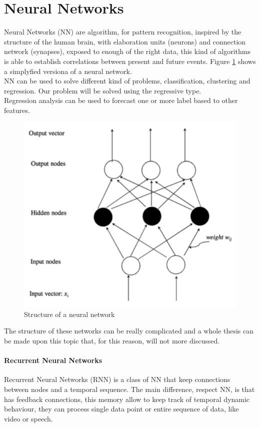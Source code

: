 \documentclass[%
    corpo=12pt,
    twoside,
    oldstyle,
    autoretitolo,
    greek,
    evenboxes,
]{toptesi}
\begin{document}
\section{Neural Networks}
Neural Networks (NN) are algorithm, for pattern recognition, inspired by the structure of the human brain, with elaboration units (neurons) and connection network (synapses), exposed to enough of the right data, this kind of algorithms is able to establish correlations between present and future events. Figure \ref{fig:nn} shows a simplyfied versiona of a neural network.\\
NN can be used to solve different kind of problems, classification, clustering and regression. Our problem will be solved using the regressive type.\\
Regression analysis can be used to forecast one or more label based to other features.
\begin{figure}[!h]
  \includegraphics[width=\linewidth]{figure/nn.png}
  \caption{Structure of a neural network}
  \label{fig:nn}
\end{figure}
The structure of these networks can be really complicated and a whole thesis can be made upon this topic that, for this reason, will not more discussed.

\paragraph{Recurrent Neural Networks}
Recurrent Neural Networks (RNN) is a class of NN that keep connections between nodes and a temporal sequence. The main difference, respect NN, is that has feedback connections, this memory allow to keep track of temporal dynamic behaviour, they can process single data point or entire sequence of data, like video or speech.
\end{document}
